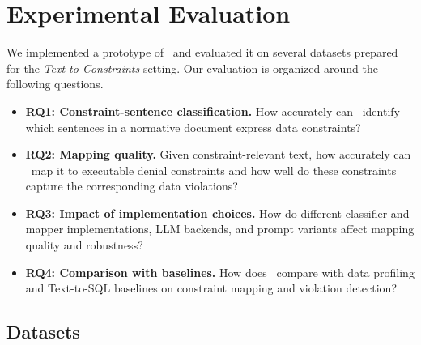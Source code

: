 


\section{Experimental Evaluation}
\label{sec:experiments}

We implemented a prototype of \system\ and evaluated it on several datasets prepared for the \emph{Text-to-Constraints} setting. Our evaluation is organized around the following questions.
\begin{itemize}[leftmargin=0.5cm]
    \item \textbf{RQ1: Constraint-sentence classification.} How accurately can \system\ identify which sentences in a normative document express data constraints?

    \item \textbf{RQ2: Mapping quality.} Given constraint-relevant text, how accurately can \system\ map it to executable denial constraints and  how well do these constraints capture the corresponding data violations?

    \item \textbf{RQ3: Impact of implementation choices.} How do different classifier and mapper implementations, LLM backends, and prompt variants affect mapping quality and robustness?

    \item \textbf{RQ4: Comparison with baselines.} How does \system\ compare with data profiling and Text-to-SQL baselines on constraint mapping and violation detection?
\end{itemize}

\subsection{Datasets}
\label{sec:datasets}



